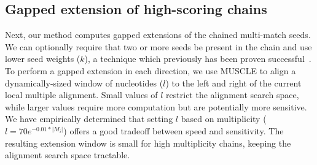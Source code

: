 \documentclass[9.5pt,journal,final,finalsubmission,twocolumn]{IEEEtran}
\begin{document}
\subsection{Gapped extension of high-scoring chains}
Next, our method computes gapped extensions of the chained multi-match seeds.
We can optionally require that two or more seeds be present
in the chain and use lower seed weights ($k$), a technique which previously has
been proven
successful~\cite{ref-blastz,ref-gappedblast,ref-blat}.  To perform a
gapped extension in each direction, we use MUSCLE to align a dynamically-sized window
of nucleotides ($l$) to the left and right of the current local
multiple alignment.  Small values of $l$ restrict the alignment search
space, while larger values require more computation but are
potentially more sensitive.  We have empirically determined that
setting $l$ based on multiplicity ($l = 70e^{-0.01*|M_{i}|}$) offers a
good tradeoff between speed and sensitivity.  The resulting extension
window is small for high multiplicity chains,
keeping the alignment search space tractable.
\end{document}
